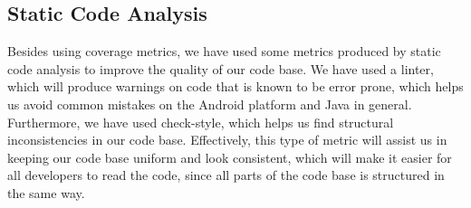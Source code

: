 \subsection{Static Code Analysis}
Besides using coverage metrics, we have used some metrics produced by static code analysis to improve the quality of our code base. We have used a linter, which will produce warnings on code that is known to be error prone, which helps us avoid common mistakes on the Android platform and Java in general. Furthermore, we have used check-style, which helps us find structural inconsistencies in our code base. Effectively, this type of metric will assist us in keeping our code base uniform and look consistent, which will make it easier for all developers to read the code, since all parts of the code base is structured in the same way.
